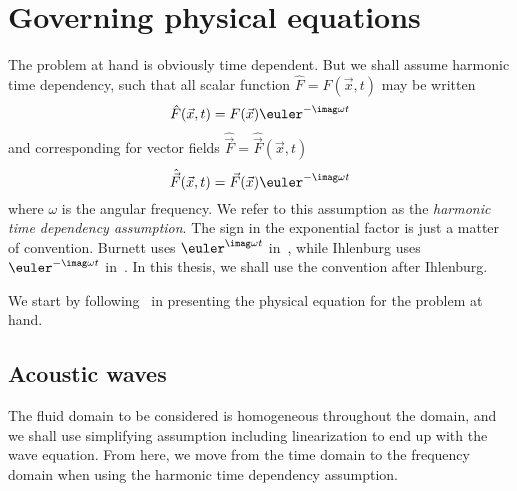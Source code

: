 \section{Governing physical equations}
\label{Sec2:physicalProblem}
The problem at hand is obviously time dependent. But we shall assume harmonic time dependency, such that all scalar function $\hat{F}=\hat{F}(\vec{x},t)$ may be written
\begin{equation}\label{Eq2:periodicityAssumption}
	\hat{F}(\vec{x}, t) = F(\vec{x})\euler^{-\imag\omega t}
\end{equation}
and corresponding for vector fields $\hat{\vec{F}} = \hat{\vec{F}}(\vec{x},t)$
\begin{equation*}
	\hat{\vec{F}}(\vec{x},t) = \vec{F}(\vec{x})\euler^{-\imag\omega t}
\end{equation*}
where $\omega$ is the angular frequency. We refer to this assumption as the \textit{harmonic time dependency assumption}. The sign in the exponential factor is just a matter of convention. Burnett uses $\euler^{\imag\omega t}$ in~\cite{Burnett1994atd}, while Ihlenburg uses $\euler^{-\imag\omega t}$ in~\cite{Ihlenburg1998fea}. In this thesis, we shall use the convention after Ihlenburg.

We start by following~\cite[pp. 1-4]{Ihlenburg1998fea} in presenting the physical equation for the problem at hand.

\subsection{Acoustic waves}
The fluid domain to be considered is homogeneous throughout the domain, and we shall use simplifying assumption including linearization to end up with the wave equation. From here, we move from the time domain to the frequency domain when using the harmonic time dependency assumption.

